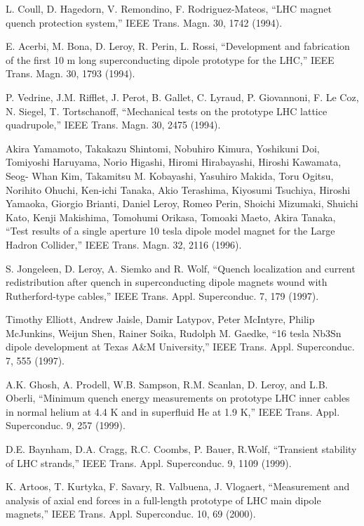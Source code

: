 \noindent [9.312] L. Coull, D. Hagedorn, V. Remondino, F. Rodriguez-Mateos, ``LHC magnet
quench protection system,” IEEE Trans. Magn. 30, 1742 (1994).

\noindent [9.313] E. Acerbi, M. Bona, D. Leroy, R. Perin, L. Rossi, ``Development and fabrication of
the first 10 m long superconducting dipole prototype for the LHC,” IEEE Trans.
Magn. 30, 1793 (1994).

\noindent [9.314] P. Vedrine, J.M. Rifflet, J. Perot, B. Gallet, C. Lyraud, P. Giovannoni, F. Le
Coz, N. Siegel, T. Tortschanoff, ``Mechanical tests on the prototype LHC lattice
quadrupole,” IEEE Trans. Magn. 30, 2475 (1994).

\noindent [9.315] Akira Yamamoto, Takakazu Shintomi, Nobuhiro Kimura, Yoshikuni Doi, Tomiyoshi
Haruyama, Norio Higashi, Hiromi Hirabayashi, Hiroshi Kawamata, Seog-
Whan Kim, Takamitsu M. Kobayashi, Yasuhiro Makida, Toru Ogitsu, Norihito
Ohuchi, Ken-ichi Tanaka, Akio Terashima, Kiyosumi Tsuchiya, Hiroshi Yamaoka,
Giorgio Brianti, Daniel Leroy, Romeo Perin, Shoichi Mizumaki, Shuichi Kato,
Kenji Makishima, Tomohumi Orikasa, Tomoaki Maeto, Akira Tanaka, ``Test results
of a single aperture 10 tesla dipole model magnet for the Large Hadron
Collider,” IEEE Trans. Magn. 32, 2116 (1996).

\noindent [9.316] S. Jongeleen, D. Leroy, A. Siemko and R. Wolf, ``Quench localization and current
redistribution after quench in superconducting dipole magnets wound with
Rutherford-type cables,” IEEE Trans. Appl. Superconduc. 7, 179 (1997).

\noindent [9.317] Timothy Elliott, Andrew Jaisle, Damir Latypov, Peter McIntyre, Philip McJunkins,
Weijun Shen, Rainer Soika, Rudolph M. Gaedke, ``16 tesla Nb3Sn dipole
development at Texas A\&M University,” IEEE Trans. Appl. Superconduc. 7, 555
(1997).

\noindent [9.318] A.K. Ghosh, A. Prodell, W.B. Sampson, R.M. Scanlan, D. Leroy, and L.B. Oberli,
``Minimum quench energy measurements on prototype LHC inner cables in normal
helium at 4.4 K and in superfluid He at 1.9 K,” IEEE Trans. Appl. Superconduc.
9, 257 (1999).

\noindent [9.319] D.E. Baynham, D.A. Cragg, R.C. Coombs, P. Bauer, R.Wolf, ``Transient stability
of LHC strands,” IEEE Trans. Appl. Superconduc. 9, 1109 (1999).

\noindent [9.320] K. Artoos, T. Kurtyka, F. Savary, R. Valbuena, J. Vlogaert, ``Measurement and
analysis of axial end forces in a full-length prototype of LHC main dipole magnets,” IEEE Trans. Appl. Superconduc. 10, 69 (2000).


